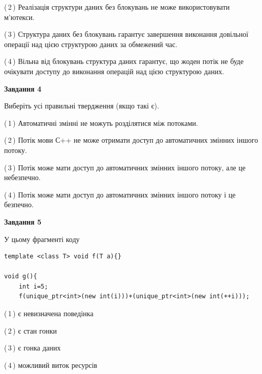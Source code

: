 \documentclass[12pt, ukrainian]{article}
\begin{document}
\begin {large}
{(\,2\,) Реалізація структури даних без блокувань не може використовувати м’ютекси.%

(\,3\,) Структура даних без блокувань гарантує завершення виконання довільної операції над цією структурою даних за обмежений час.%

(\,4\,) Вільна від блокувань структура даних гарантує, що жоден потік не буде очікувати доступу до виконання операцій над цією структурою даних.%



\begin{center}
\textbf{Завдання 4}
\end{center}
Виберіть усі правильні твердження (якщо такі є).\par
\vspace{2mm}

(\,1\,) Автоматичні змінні не можуть розділятися між потоками.%

(\,2\,) Потік мови С++ не може отримати доступ до автоматичних змінних іншого потоку.%

(\,3\,) Потік може мати доступ до автоматичних змінних іншого потоку, але це небезпечно.%

(\,4\,) Потік може мати доступ до автоматичних змінних іншого потоку і це безпечно.%



\begin{center}
\textbf{Завдання 5}
\end{center}
У цьому фрагменті коду
\begin{verbatim}
template <class T> void f(T a){}

void g(){
    int i=5;
    f(unique_ptr<int>(new int(i)))+(unique_ptr<int>(new int(++i)));
\end{verbatim}
(\,1\,) є невизначена поведінка%

(\,2\,) є стан гонки%

(\,3\,) є гонка даних%

(\,4\,) можливий виток ресурсів%


}
\end {large}
\end{document}
